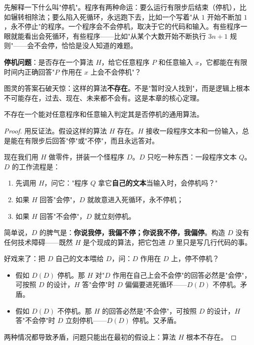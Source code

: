 先解释一下什么叫"停机"。程序有两种命运：要么运行有限步后结束（停机），比如辗转相除法；要么陷入死循环，永远跑下去，比如一个写着"从 $1$ 开始不断加 $1$，永不停止"的程序。一个程序会不会停机，取决于它的代码和输入。有些程序一眼就能看出会死循环，有些程序——比如"从某个大数开始不断执行 $3n+1$ 规则"——会不会停，恰恰是没人知道的难题。

\begin{dingyi}
\textbf{停机问题}：是否存在一个算法 $H$，给它任意程序 $P$ 和任意输入 $x$，它都能在有限时间内正确回答"$P$ 作用在 $x$ 上会不会停机"？
\end{dingyi}

图灵的答案石破天惊：这样的算法\textbf{不存在}。不是"暂时没人找到"，而是逻辑上根本不可能存在，过去、现在、未来都不会有。这是本章的核心定理。

\begin{dingli}[停机问题不可判定]
不存在一个能对任意程序和任意输入判定其是否停机的通用算法。
\end{dingli}

\begin{proof}
用反证法。假设这样的算法 $H$ 存在。$H$ 接收一段程序文本和一份输入，总是能在有限步后回答"停"或"不停"，而且永远答对。

现在我们用 $H$ 做零件，拼装一个怪程序 $D$。$D$ 只吃一种东西：一段程序文本 $Q$。$D$ 的工作流程是：

\begin{enumerate}
\item 先调用 $H$，问它："程序 $Q$ 拿它\textbf{自己的文本}当输入时，会停机吗？"
\item 如果 $H$ 回答"会停"，$D$ 就故意进入死循环，永不停机；
\item 如果 $H$ 回答"不会停"，$D$ 就立刻停机。
\end{enumerate}

简单说，$D$ 的脾气是：\textbf{你说我停，我偏不停；你说我不停，我偏停}。构造 $D$ 没有任何技术障碍——既然 $H$ 是个现成的算法，把它包进 $D$ 里只是写几行代码的事。

好戏来了：把 $D$ 自己的文本喂给 $D$，问：$D$ 作用在 $D$ 上，停不停机？

\begin{itemize}
\item 假如 $D(D)$ 停机。那 $H$ 对"$D$ 作用在自己上会不会停"的回答必然是"会停"，可按照 $D$ 的设计，$H$ 答"会停"时 $D$ 偏偏要进死循环——$D(D)$ 不停机。矛盾。
\item 假如 $D(D)$ 不停机。那 $H$ 的回答必然是"不会停"，可按照 $D$ 的设计，$H$ 答"不会停"时 $D$ 立刻停机——$D(D)$ 停机。又矛盾。
\end{itemize}

两种情况都导致矛盾，问题只能出在最初的假设上：算法 $H$ 根本不存在。
\end{proof}

